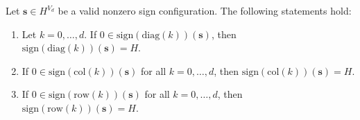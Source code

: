 \begin{proposition}\label{prop:sign-sikjsfnf322}
    Let \( \mathbf{s} \in H^{V_d} \) be a valid nonzero sign configuration. The following statements hold:
    \begin{enumerate}
        \item Let \( k = 0, \dots, d \). If \( 0 \in \mathrm{sign}(\mathrm{diag}(k))(\mathbf{s})  \), then \( \mathrm{sign}(\mathrm{diag}(k))(\mathbf{s}) = H \).
        \item If \( 0 \in \mathrm{sign}(\mathrm{col}(k))(\mathbf{s}) \) for all \( k = 0, \dots, d \), then \( \mathrm{sign}(\mathrm{col}(k))(\mathbf{s}) = H \).
        \item If \( 0 \in \mathrm{sign}(\mathrm{row}(k))(\mathbf{s}) \) for all \( k = 0, \dots, d \), then \( \mathrm{sign}(\mathrm{row}(k))(\mathbf{s}) = H \).
    \end{enumerate}
\end{proposition}

